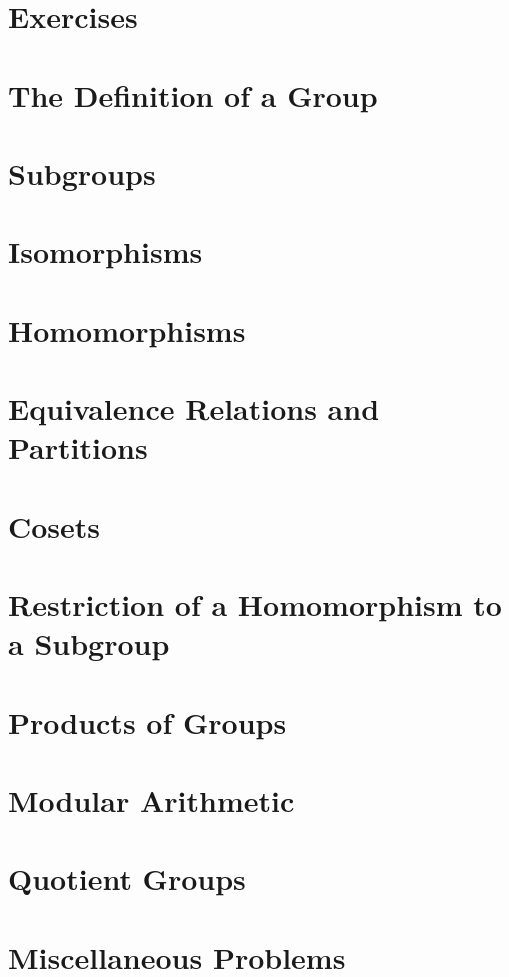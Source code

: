 \documentclass[]{book}
\begin{document}
\section*{Exercises}

\section{The Definition of a Group}

\section{Subgroups}

\section{Isomorphisms}

\section{Homomorphisms}

\section{Equivalence Relations and Partitions}

\section{Cosets}

\section{Restriction of a Homomorphism to a Subgroup}

\section{Products of Groups}

\section{Modular Arithmetic}

\section{Quotient Groups}

\section{Miscellaneous Problems}

\end{document}
